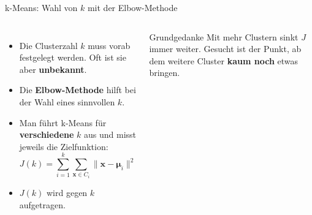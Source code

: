 \begin{frame}{k-Means: Wahl von $k$ mit der Elbow-Methode}
\begin{columns}
\begin{itemize}
  \item Die Clusterzahl $k$ muss vorab festgelegt werden. Oft ist sie aber
        \textbf{unbekannt}.
  \item Die \textbf{Elbow-Methode} hilft bei der Wahl eines sinnvollen $k$.
  \item Man führt k-Means für \textbf{verschiedene} $k$ aus und misst jeweils
        die Zielfunktion:
        \[
          J(k) = \sum_{i=1}^{k} \sum_{\mathbf{x} \in C_i}
                 \lVert \mathbf{x} - \boldsymbol{\mu}_i \rVert^2
        \]
  \item $J(k)$ wird gegen $k$ aufgetragen.
\end{itemize}

\begin{block}{Grundgedanke}
Mit mehr Clustern sinkt $J$ immer weiter. Gesucht ist der Punkt, ab dem
weitere Cluster \textbf{kaum noch} etwas bringen.
\end{block}
\end{columns}
\end{frame}


